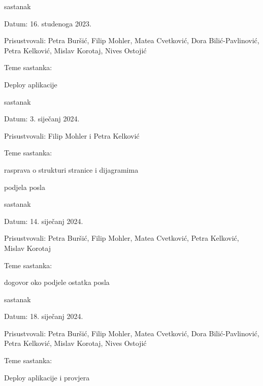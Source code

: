 \begin{packed_enum}
				\item  sastanak
			\item[] \begin{packed_item}
				\item Datum: 16. studenoga 2023.
				\item Prisustvovali: Petra Buršić, Filip Mohler, Matea Cvetković, Dora Bilić-Pavlinović, Petra Kelković, Mislav Korotaj, Nives Ostojić
				\item Teme sastanka:
				\begin{packed_item}
					\item  Deploy aplikacije
				\end{packed_item}
			\end{packed_item}
			
				\item  sastanak
			\item[] \begin{packed_item}
				\item Datum: 3. siječanj 2024.
				\item Prisustvovali: Filip Mohler i Petra Kelković
				\item Teme sastanka:
				\begin{packed_item}
					\item  rasprava o strukturi stranice i dijagramima
					\item podjela posla
				\end{packed_item}
			\end{packed_item}
			
				\item  sastanak
			\item[] \begin{packed_item}
				\item Datum: 14. siječanj 2024.
				\item Prisustvovali: Petra Buršić, Filip Mohler, Matea Cvetković, Petra Kelković, Mislav Korotaj
				\item Teme sastanka: 
				\begin{packed_item}
					\item  dogovor oko podjele ostatka posla
				\end{packed_item}
			\end{packed_item}
			
				\item  sastanak
			\item[] \begin{packed_item}
				\item Datum: 18. siječanj 2024.
				\item Prisustvovali: Petra Buršić, Filip Mohler, Matea Cvetković, Dora Bilić-Pavlinović, Petra Kelković, Mislav Korotaj, Nives Ostojić
				\item Teme sastanka:
				\begin{packed_item}
					\item  Deploy aplikacije i provjera 
				\end{packed_item}
			\end{packed_item}
			
			
		\end{packed_enum}
		
